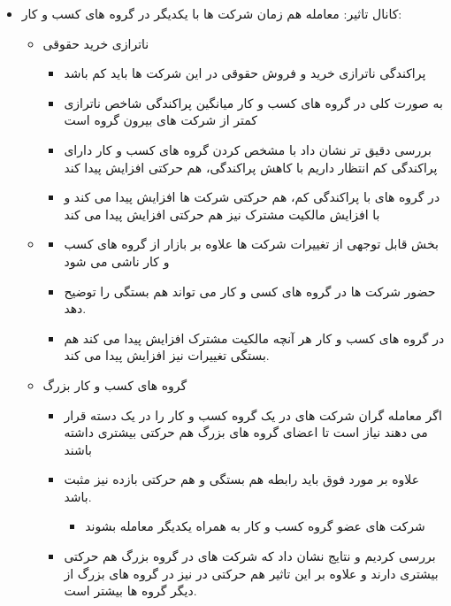 \documentclass[12pt, a4paper]{article}
\begin{document}
\begin{itemize}
\item
کانال تاثیر: معامله هم زمان شرکت ها با یکدیگر در گروه های کسب و کار:
\begin{itemize}
\item 
ناترازی خرید حقوقی
\begin{itemize}
\item
پراکندگی ناترازی خرید و فروش حقوقی در این شرکت ها باید کم باشد
\item 
به صورت کلی در گروه های کسب و کار میانگین پراکندگی شاخص ناترازی کمتر از شرکت های بیرون گروه است
\item
 بررسی دقیق تر نشان داد با مشخص کردن گروه های کسب و کار دارای پراکندگی کم انتظار داریم با کاهش پراکندگی، هم حرکتی افزایش پیدا کند
 \item
 در گروه های با پراکندگی کم، هم حرکتی شرکت ها افزایش پیدا می کند و با افزایش مالکیت مشترک نیز هم حرکتی افزایش پیدا می کند
 
\end{itemize}
\item
{}
\begin{itemize}
\item
بخش قابل توجهی از تغییرات 
شرکت ها علاوه بر بازار از گروه های کسب و کار ناشی می شود
\item
حضور شرکت ها در گروه های کسی و کار می تواند هم بستگی 
را توضیح دهد.
\item
در گروه های کسب و کار هر آنچه مالکیت مشترک افزایش پیدا می کند هم بستگی تغییرات 
نیز افزایش پیدا می کند.

\end{itemize}
\item
گروه های کسب و کار بزرگ
\begin{itemize}
	\item 
	اگر معامله گران شرکت های در یک گروه کسب و کار را در یک دسته قرار می دهند نیاز است تا اعضای گروه های بزرگ هم حرکتی بیشتری داشته باشند
	\item
	علاوه بر مورد فوق باید رابطه هم بستگی 
	و هم حرکتی بازده نیز مثبت باشد. 
	\begin{itemize}
		\item 
		شرکت های عضو گروه کسب و کار به همراه یکدیگر معامله بشوند
		
	\end{itemize}
\item
بررسی کردیم و نتایج نشان داد که شرکت های در گروه بزرگ هم حرکتی بیشتری دارند و علاوه بر این تاثیر هم حرکتی در 
نیز در گروه های بزرگ از دیگر گروه ها بیشتر است.
\end{itemize}
\end{itemize}
\end{itemize}
\end{document}
